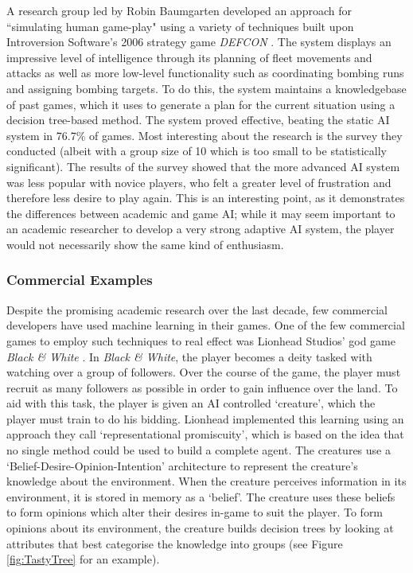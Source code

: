 \documentclass[a4paper,oneside]{report}
\begin{document}
A research group led by Robin Baumgarten developed an approach for ``simulating human game-play" using a variety of techniques built upon Introversion Software's 2006 strategy game \emph{DEFCON} \cite{Baumgarten:2008il}. The system displays an impressive level of intelligence through its planning of fleet movements and attacks as well as more low-level functionality such as coordinating bombing runs and assigning bombing targets. To do this, the system maintains a knowledgebase of past games, which it uses to generate a plan for the current situation using a decision tree-based method. The system proved effective, beating the static AI system in 76.7\% of games. Most interesting about the research is the survey they conducted (albeit with a group size of 10 which is too small to be statistically significant). The results of the survey showed that the more advanced AI system was less popular with novice players, who felt a greater level of frustration and therefore less desire to play again. This is an interesting point, as it demonstrates the differences between academic and game AI; while it may seem important to an academic researcher to develop a very strong adaptive AI system, the player would not necessarily show the same kind of enthusiasm.

\subsubsection{Commercial Examples}

Despite the promising academic research over the last decade, few commercial developers have used machine learning in their games. One of the few commercial games to employ such techniques to real effect was Lionhead Studios' god game \emph{Black \& White} \cite{:hc}. In \emph{Black \& White}, the player becomes a deity tasked with watching over a group of followers. Over the course of the game, the player must recruit as many followers as possible in order to gain influence over the land. To aid with this task, the player is given an AI controlled `creature', which the player must train to do his bidding. Lionhead implemented this learning using an approach they call `representational promiscuity', which is based on the idea that no single method could be used to build a complete agent. The creatures use a `Belief-Desire-Opinion-Intention' architecture to represent the creature's knowledge about the environment. When the creature perceives information in its environment, it is stored in memory as a `belief'. The creature uses these beliefs to form opinions which alter their desires in-game to suit the player. To form opinions about its environment, the creature builds decision trees by looking at attributes that best categorise the knowledge into groups (see Figure \ref{fig:TastyTree} for an example).
\end{document}
